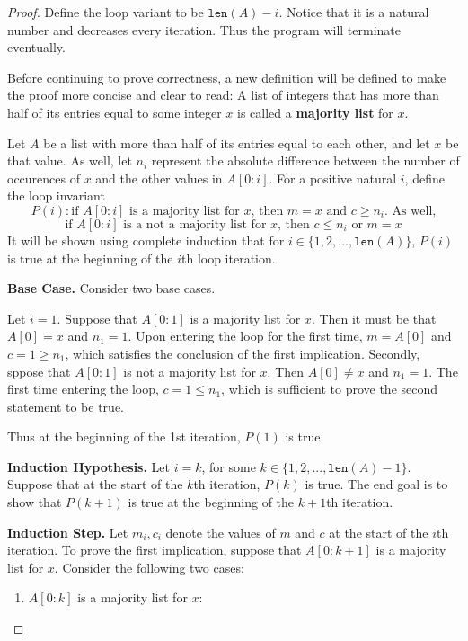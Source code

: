 \documentclass[11pt]{article}
\begin{document}
    \begin{proof}
        Define the loop variant to be \(\texttt{len}(A) - i\). Notice that it is a natural number and decreases every iteration. Thus the program will terminate eventually.

        Before continuing to prove correctness, a new definition will be defined to make the proof more concise and clear to read: A list of integers that has more than half of its entries equal to some integer \(x\) is called a \textbf{majority list} for \(x\).

        Let \(A\) be a list with more than half of its entries equal to each other, and let \(x\) be that value. As well, let \(n_i\) represent the absolute difference between the number of occurences of \(x\) and the other values in \(A[0:i]\). For a positive natural \(i\), define the loop invariant
        \[
            P(i) : \text{if } A[0:i] \text{ is a majority list for } x \text{, then } m=x \text{ and } c \geq n_i \text{. As well,}
        \]
        \[
            \text{if } A[0:i] \text{ is a not a majority list for } x \text{, then } c\leq n_i \text{ or } m=x
        \]
        It will be shown using complete induction that for \(i \in \{1,2,...,\texttt{len}(A)\}\), \(P(i)\) is true at the beginning of the \(i\)th loop iteration.

        \textbf{Base Case.} Consider two base cases.
        
        Let \(i = 1\). Suppose that \(A[0:1]\) is a majority list for \(x\). Then it must be that \(A[0]=x\) and \(n_1=1\). Upon entering the loop for the first time, \(m=A[0]\) and \(c=1\geq n_1\), which satisfies the conclusion of the first implication. Secondly, sppose that \(A[0:1]\) is not a majority list for \(x\). Then \(A[0]\neq x\) and \(n_1=1\). The first time entering the loop, \(c=1\leq n_1\), which is sufficient to prove the second statement to be true.

        Thus at the beginning of the 1st iteration, \(P(1)\) is true.

        \textbf{Induction Hypothesis.} Let \(i=k\), for some \(k \in \{1,2,...,\texttt{len}(A) -1\}\). Suppose that at the start of the \(k\)th iteration, \(P(k)\) is true. The end goal is to show that \(P(k+1)\) is true at the beginning of the \(k+1\)th iteration.

        \textbf{Induction Step.} Let \(m_i, c_i\) denote the values of \(m\) and \(c\) at the start of the \(i\)th iteration. To prove the first implication, suppose that \(A[0:k+1]\) is a majority list for \(x\). Consider the following two cases:
        \begin{enumerate}
            \item \(A[0:k]\) is a majority list for \(x\):
            

\end{enumerate}
\end{proof}
\end{document}
